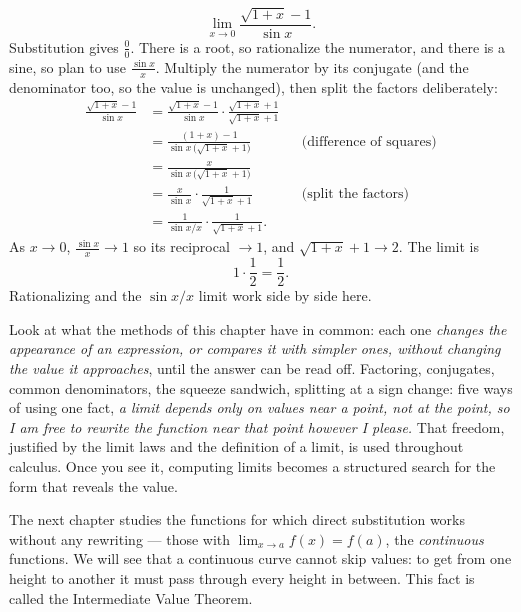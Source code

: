 \begin{example}
\label{ch07:ex-combo}
\[
  \lim_{x\to 0}\frac{\sqrt{1+x}-1}{\sin x}.
\]
Substitution gives $\frac00$. There is a root, so rationalize the numerator,
and there is a sine, so plan to use $\frac{\sin x}{x}$. Multiply the numerator
by its conjugate (and the denominator too, so the value is unchanged), then
split the factors deliberately:
\begin{align*}
  \frac{\sqrt{1+x}-1}{\sin x}
  &= \frac{\sqrt{1+x}-1}{\sin x}\cdot\frac{\sqrt{1+x}+1}{\sqrt{1+x}+1}\\
  &= \frac{(1+x)-1}{\sin x\,\big(\sqrt{1+x}+1\big)}
    && \text{(difference of squares)}\\
  &= \frac{x}{\sin x\,\big(\sqrt{1+x}+1\big)}\\
  &= \frac{x}{\sin x}\cdot\frac{1}{\sqrt{1+x}+1}
    && \text{(split the factors)}\\
  &= \frac{1}{\sin x/x}\cdot\frac{1}{\sqrt{1+x}+1}.
\end{align*}
As $x\to 0$, $\frac{\sin x}{x}\to 1$ so its reciprocal $\to 1$, and
$\sqrt{1+x}+1 \to 2$. The limit is
\[
  1\cdot\frac{1}{2} = \frac12.
\]
Rationalizing and the $\sin x/x$ limit work side by side here.
\end{example}

\begin{aestheticbox}
Look at what the methods of
this chapter have in common: each one \emph{changes the appearance of an
expression, or compares it with simpler ones, without changing the value it approaches}, until the answer can be
read off. Factoring, conjugates, common denominators, the squeeze
sandwich, splitting at a sign change: five ways of using one fact,
\emph{a limit depends only on values near a point, not at the point, so I am free to rewrite the function
near that point however I please.} That freedom, justified by the limit
laws and the definition of a limit, is used throughout
calculus. Once you see it, computing limits
becomes a structured search for the form that reveals the value.
\end{aestheticbox}

The next chapter studies the functions for which direct substitution works
without any rewriting --- those with $\lim_{x\to a} f(x) = f(a)$, the
\emph{continuous} functions. We will see that a continuous curve cannot skip
values: to get from one height to another it must pass through every height in
between. This fact is called the Intermediate Value Theorem.

